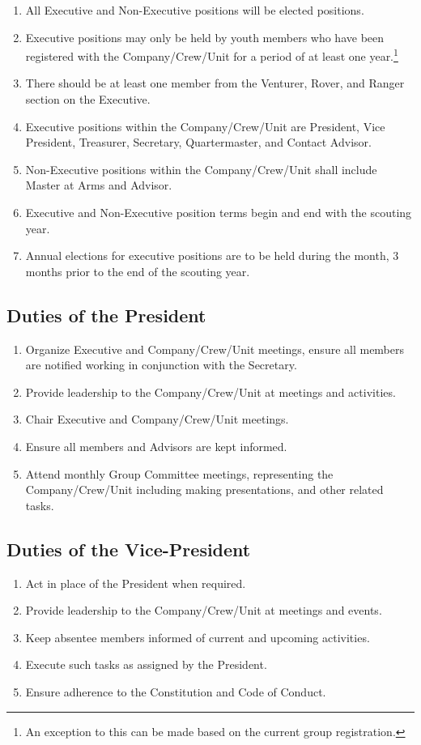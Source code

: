 \begin{enumerate}
    \item All Executive and Non-Executive positions will be elected positions.
    \item Executive positions may only be held by youth members who have been registered with the Company/Crew/Unit for a period of at least one year.\footnote{An exception to this can be made based on the current group registration.}
    \item There should be at least one member from the Venturer, Rover, and Ranger section on the Executive.\footnotemark[\value{footnote}]
    \item Executive positions within the Company/Crew/Unit are President, Vice President, Treasurer, Secretary, Quartermaster, and Contact Advisor.
    \item Non-Executive positions within the Company/Crew/Unit shall include Master at Arms and Advisor.
    \item Executive and Non-Executive position terms begin and end with the scouting year.
    \item Annual elections for executive positions are to be held during the month, 3 months prior to the end of the scouting year.
\end{enumerate}

\subsection{Duties of the President}\label{subsec:duties-of-the-president}
\begin{enumerate}
    \item Organize Executive and Company/Crew/Unit meetings, ensure all members are notified working in conjunction with the Secretary.
    \item Provide leadership to the Company/Crew/Unit at meetings and activities.
    \item Chair Executive and Company/Crew/Unit meetings.
    \item Ensure all members and Advisors are kept informed.
    \item Attend monthly Group Committee meetings, representing the Company/Crew/Unit including making presentations, and other related tasks.
\end{enumerate}

\subsection{Duties of the Vice-President}\label{subsec:duties-of-the-vice-president}
\begin{enumerate}
    \item Act in place of the President when required.
    \item Provide leadership to the Company/Crew/Unit at meetings and events.
    \item Keep absentee members informed of current and upcoming activities.
    \item Execute such tasks as assigned by the President.
    \item Ensure adherence to the Constitution and Code of Conduct.
\end{enumerate}

